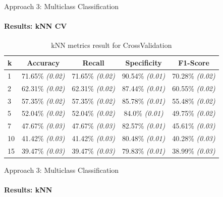 \documentclass[9pt, pstricks, xcolor=dvipsnames]{beamer}
\begin{document}
\begin{frame}{Approach 3: Multiclass Classification}
\framesubtitle{Results: kNN CV}
\begin{table}[H]
\centering
\begin{tabular}{lcccc}
\toprule
k & Accuracy & Recall & Specificity & F1-Score \\
\midrule
1 & 71.65\% \textit{(0.02)} & 71.65\% \textit{(0.02)} & 90.54\% \textit{(0.01)} & 70.28\% \textit{(0.02)} \\
2 & 62.31\% \textit{(0.02)} & 62.31\% \textit{(0.02)} & 87.44\% \textit{(0.01)} & 60.55\% \textit{(0.02)} \\
3 & 57.35\% \textit{(0.02)} & 57.35\% \textit{(0.02)} & 85.78\% \textit{(0.01)} & 55.48\% \textit{(0.02)} \\
5 & 52.04\% \textit{(0.02)} & 52.04\% \textit{(0.02)} & 84.0\% \textit{(0.01)} & 49.75\% \textit{(0.02)} \\
7 & 47.67\% \textit{(0.03)} & 47.67\% \textit{(0.03)} & 82.57\% \textit{(0.01)} & 45.61\% \textit{(0.03)} \\
10 & 41.42\% \textit{(0.03)} & 41.42\% \textit{(0.03)} & 80.48\% \textit{(0.01)} & 40.28\% \textit{(0.03)} \\
15 & 39.47\% \textit{(0.03)} & 39.47\% \textit{(0.03)} & 79.83\% \textit{(0.01)} & 38.99\% \textit{(0.03)} \\
\bottomrule
\end{tabular}
\caption{kNN metrics result for CrossValidation}
\label{tab:kNN_CV_approach3}
\end{table}
\end{frame}
\begin{frame}{Approach 3: Multiclass Classification}
\framesubtitle{Results: kNN}
\begin{table}[H]
\centering
{}
\caption{kNN metrics result}
\label{tab:kNN_approach3}
\end{table}
\end{frame}
\end{document}
